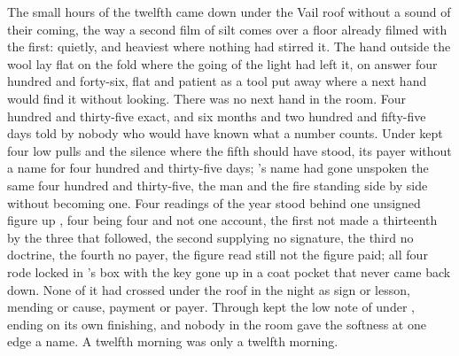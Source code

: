 
The small hours of the twelfth came down under the Vail roof without a sound of their coming, the way a second film of silt comes over a floor already filmed with the first: quietly, and heaviest where nothing had stirred it. The hand outside the wool lay flat on the fold where the going of the light had left it, on answer four hundred and forty-six, flat and patient as a tool put away where a next hand would find it without looking. There was no next hand in the room. Four hundred and thirty-five exact, and six months and two hundred and fifty-five days told by nobody who would have known what a number counts. Under   kept four low pulls and the silence where the fifth should have stood, its payer without a name for four hundred and thirty-five days; 's name had gone unspoken the same four hundred and thirty-five, the man and the fire standing side by side without becoming one. Four readings of the year stood behind one unsigned figure up , four being four and not one account, the first not made a thirteenth by the three that followed, the second supplying no signature, the third no doctrine, the fourth no payer, the figure read still not the figure paid; all four rode locked in 's box with the key gone up in a coat pocket that never came back down. None of it had crossed under the roof in the night as sign or lesson, mending or cause, payment or payer. Through   kept the low note of  under , ending on its own finishing, and nobody in the room gave the softness at one edge a name. A twelfth morning was only a twelfth morning.

